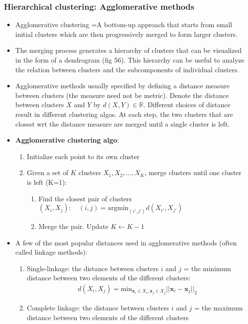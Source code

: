 \documentclass[norsk,a4paper,11pt]{article}
\begin{document}
\subsubsection{Hierarchical clustering: Agglomerative methods}
\begin{itemize}
	\item Agglomerative clustering =A bottom-up approach that starts from small initial clusters which are then progressively merged to form larger clusters.
	\item The merging process generates a hierarchy of clusters that can be visualized in the form of a dendrogram (fig 56). This hierarchy can be useful to analyze the relation between clusters and the subcomponents of individual clusters. 
	\item Agglomerative methods usually specified by defining a distance measure between clusters (the measure need not be metric). Denote the distance between clusters $X$ and $Y$ by $d(X,Y) \in \mathbb{R}$. Different choices of distance result in different clustering algos.   
	At each step, the two clusters that are closest wrt the distance measure are merged until a single cluster is left.
	\item \textbf{Agglomerative clustering algo}:
	\begin{enumerate}
		\item Initialize each point to its own cluster
		\item Given a set of $K$ clusters $X_1, X_2, ..., X_K$, merge clusters until one cluster is left (K=1):
		\begin{enumerate}
			\item Find the closest pair of clusters $(X_i, X_j): \quad (i,j) = \text{argmin}_{(i', j')} d(X_{i'}, X_{j'})$
			\item Merge the pair. Update $K \leftarrow K -1 $
		\end{enumerate}
	\end{enumerate}
	\item A few of the most popular distances used in agglomerative methods (often called linkage methods):
	\begin{enumerate}
		\item Single-linkage: the distance between clusters $i$ and $j$ = the minimum distance between two elements of the different clusters:
		\begin{align}
			d(X_i, X_j) = \text{min}_{\bm{x}_i \in X_i, \bm{x}_j \in X_j} ||\bm{x}_i -\bm{x}_j||_2
		\end{align}
		\item Complete linkage: the distance between clusters $i$ and $j$ = the maximum distance between two elements of the different clusters

\end{enumerate}
\end{itemize}
\end{document}
